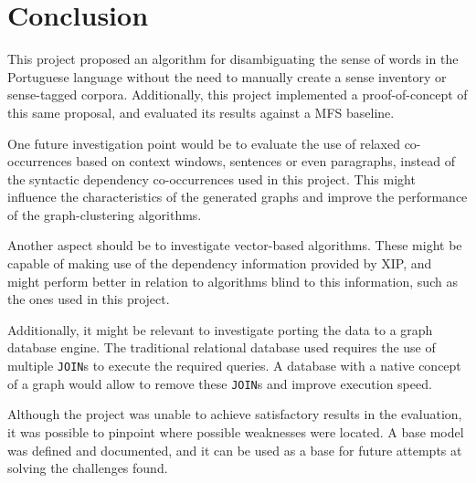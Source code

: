 \chapter{Conclusion}
\label{ch:conclusion}

This project proposed an algorithm for disambiguating the sense of words in the
Portuguese language without the need to manually create a sense inventory or
sense-tagged corpora. Additionally, this project implemented a proof-of-concept
of this same proposal, and evaluated its results against a \ac{MFS} baseline.

One future investigation point would be to evaluate the use of relaxed
co-occurrences based on context windows, sentences or even paragraphs, instead
of the syntactic dependency co-occurrences used in this project. This might
influence the characteristics of the generated graphs and improve the
performance of the graph-clustering algorithms.

Another aspect should be to investigate vector-based algorithms. These might be
capable of making use of the dependency information provided by \ac{XIP}, and
might perform better in relation to algorithms blind to this
information, such as the ones used in this project.

Additionally, it might be relevant to investigate porting the data to a graph
database engine. The traditional relational database used requires the use of
multiple \texttt{JOIN}s to execute the required queries. A database with a
native concept of a graph would allow to remove these \texttt{JOIN}s and improve
execution speed.

Although the project was unable to achieve satisfactory results in the
evaluation, it was possible to pinpoint where possible weaknesses were located.
A base model was defined and documented, and it can be used as a base for future
attempts at solving the challenges found.

